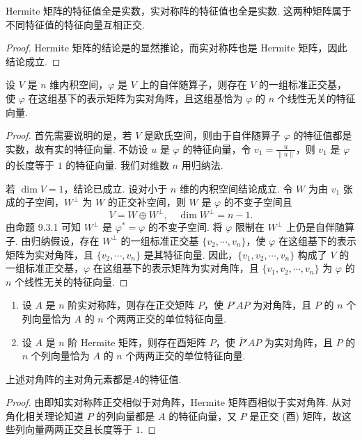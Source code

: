 \documentclass[../../main.tex]{subfiles}
\begin{document}
\begin{corollary}\label{corollary:Hermite矩阵和实对称矩阵关于特征值的相关性质}
Hermite 矩阵的特征值全是实数，实对称阵的特征值也全是实数. 这两种矩阵属于不同特征值的特征向量互相正交.
\end{corollary}
\begin{proof}
Hermite 矩阵的结论是的显然推论，而实对称阵也是 Hermite 矩阵，因此结论成立.
\end{proof}

\begin{theorem}\label{theorem:关于自伴随算子正交对角化}
设 $V$ 是 $n$ 维内积空间，$\varphi$ 是 $V$ 上的自伴随算子，则存在 $V$ 的一组标准正交基，使 $\varphi$ 在这组基下的表示矩阵为实对角阵，且这组基恰为 $\varphi$ 的 $n$ 个线性无关的特征向量.
\end{theorem}
\begin{proof}
首先需要说明的是，若 $V$ 是欧氏空间，则由于自伴随算子 $\varphi$ 的特征值都是实数，故有实的特征向量. 不妨设 $u$ 是 $\varphi$ 的特征向量，令 $v_1 = \frac{u}{\|u\|}$，则 $v_1$ 是 $\varphi$ 的长度等于 $1$ 的特征向量. 我们对维数 $n$ 用归纳法.

若 $\dim V = 1$，结论已成立. 设对小于 $n$ 维的内积空间结论成立. 令 $W$ 为由 $v_1$ 张成的子空间，$W^\perp$ 为 $W$ 的正交补空间，则 $W$ 是 $\varphi$ 的不变子空间且
\[
V = W \oplus W^\perp, \quad \dim W^\perp = n - 1.
\]
由命题 9.3.1 可知 $W^\perp$ 是 $\varphi^* = \varphi$ 的不变子空间. 将 $\varphi$ 限制在 $W^\perp$ 上仍是自伴随算子. 由归纳假设，存在 $W^\perp$ 的一组标准正交基 $\{v_2,\cdots,v_n\}$，使 $\varphi$ 在这组基下的表示矩阵为实对角阵，且 $\{v_2,\cdots,v_n\}$ 是其特征向量. 因此，$\{v_1,v_2,\cdots,v_n\}$ 构成了 $V$ 的一组标准正交基，$\varphi$ 在这组基下的表示矩阵为实对角阵，且 $\{v_1,v_2,\cdots,v_n\}$ 为 $\varphi$ 的 $n$ 个线性无关的特征向量.
\end{proof}

\begin{theorem}\label{theorem:实对称和Hermite矩阵的正交对角化}
\begin{enumerate}
\item 设 $A$ 是 $n$ 阶实对称阵，则存在正交矩阵 $P$，使 $P'AP$ 为对角阵，且 $P$ 的 $n$ 个列向量恰为 $A$ 的 $n$ 个两两正交的单位特征向量.

\item 设 $A$ 是 $n$ 阶 Hermite 矩阵，则存在酉矩阵 $P$，使 $\overline{P}'AP$ 为实对角阵，且 $P$ 的 $n$ 个列向量恰为 $A$ 的 $n$ 个两两正交的单位特征向量.
\end{enumerate}
\end{theorem}
\begin{remark}
上述对角阵的主对角元素都是$A$的特征值.
\end{remark}
\begin{proof}
由即知实对称阵正交相似于对角阵，Hermite 矩阵酉相似于实对角阵. 从对角化相关理论知道 $P$ 的列向量都是 $A$ 的特征向量，又 $P$ 是正交 (酉) 矩阵，故这些列向量两两正交且长度等于 $1$. 
\end{proof}
\end{document}
